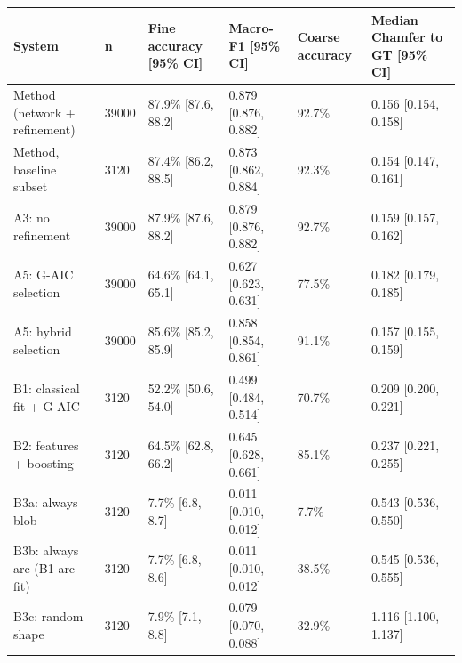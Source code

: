 \scriptsize
\begin{tabular}{llllll}
\toprule
\textbf{System} & \textbf{n} & \textbf{Fine accuracy [95\% CI]} & \textbf{Macro-F1 [95\% CI]} & \textbf{Coarse accuracy} & \textbf{Median Chamfer to GT [95\% CI]} \\
\midrule
Method (network + refinement) & 39000 & 87.9\% [87.6, 88.2] & 0.879 [0.876, 0.882] & 92.7\% & 0.156 [0.154, 0.158] \\
Method, baseline subset & 3120 & 87.4\% [86.2, 88.5] & 0.873 [0.862, 0.884] & 92.3\% & 0.154 [0.147, 0.161] \\
A3: no refinement & 39000 & 87.9\% [87.6, 88.2] & 0.879 [0.876, 0.882] & 92.7\% & 0.159 [0.157, 0.162] \\
A5: G-AIC selection & 39000 & 64.6\% [64.1, 65.1] & 0.627 [0.623, 0.631] & 77.5\% & 0.182 [0.179, 0.185] \\
A5: hybrid selection & 39000 & 85.6\% [85.2, 85.9] & 0.858 [0.854, 0.861] & 91.1\% & 0.157 [0.155, 0.159] \\
B1: classical fit + G-AIC & 3120 & 52.2\% [50.6, 54.0] & 0.499 [0.484, 0.514] & 70.7\% & 0.209 [0.200, 0.221] \\
B2: features + boosting & 3120 & 64.5\% [62.8, 66.2] & 0.645 [0.628, 0.661] & 85.1\% & 0.237 [0.221, 0.255] \\
B3a: always blob & 3120 & 7.7\% [6.8, 8.7] & 0.011 [0.010, 0.012] & 7.7\% & 0.543 [0.536, 0.550] \\
B3b: always arc (B1 arc fit) & 3120 & 7.7\% [6.8, 8.6] & 0.011 [0.010, 0.012] & 38.5\% & 0.545 [0.536, 0.555] \\
B3c: random shape & 3120 & 7.9\% [7.1, 8.8] & 0.079 [0.070, 0.088] & 32.9\% & 1.116 [1.100, 1.137] \\
\bottomrule
\end{tabular}
